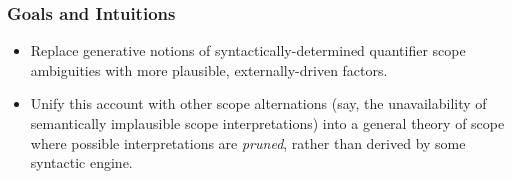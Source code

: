 \documentclass[aspectratio=1610]{beamer}
\begin{document}
\begin{frame}
\frametitle{Goals and Intuitions}\pause
	\begin{itemize}
		\item Replace generative notions of syntactically-determined quantifier scope ambiguities with more plausible, externally-driven factors.
		\item Unify this account with other scope alternations (say, the unavailability of semantically implausible scope interpretations) into a general theory of scope where possible interpretations are \emph{pruned}, rather than derived by some syntactic engine.
	\end{itemize}
\end{frame}
\end{document}
